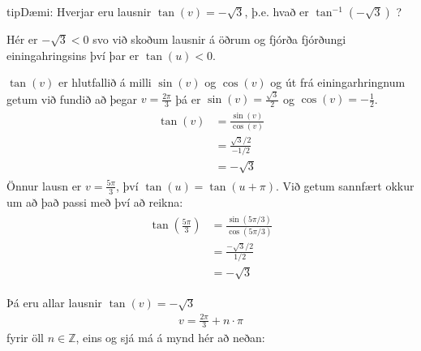 \documentclass[a4paper,10pt,icelandic]{sphinxmanual}
\begin{document}
\begin{sphinxadmonition}{tip}{Dæmi:}
Hverjar eru lausnir \(\tan(v)=-\sqrt{3}\), þ.e. hvað er \(\tan^{-1} (-\sqrt{3})\) ?

Hér er \(-\sqrt{3} <0\) svo við skoðum lausnir á öðrum og fjórða fjórðungi einingahringsins því þar er \(\tan(u)<0\).

\(\tan(v)\) er hlutfallið á milli \(\sin(v)\) og \(\cos(v)\) og út frá einingarhringnum getum við fundið að þegar \(v=\frac{2\pi}{3}\) þá er \(\sin(v) = \frac{\sqrt{3}}{2}\) og \(\cos(v) = -\frac12\).
\begin{equation*}
\begin{split}\begin{aligned}
\tan(v) &= \frac{\sin(v)}{\cos(v)} \\
&= \frac{\sqrt{3}/2}{-1/2} \\
&= -\sqrt{3}
\end{aligned}\end{split}
\end{equation*}
Önnur lausn er \(v=\frac{5\pi}{3}\), því \(\tan(u) = \tan(u+\pi)\).
Við getum sannfært okkur um að það passi með því að reikna:
\begin{equation*}
\begin{split}\begin{aligned}
\tan\left(\frac{5\pi}{3}\right) &= \frac{\sin(5\pi/3)}{\cos(5\pi/3)} \\
&= \frac{-\sqrt{3}/2}{1/2} \\
&= - \sqrt{3}
\end{aligned}\end{split}
\end{equation*}
\begin{figure}[H]
\centering

\noindent{}
\end{figure}

Þá eru allar lausnir \(\tan(v)=-\sqrt{3}\)
\begin{equation*}
\begin{split}v=\frac{2\pi}{3} + n \cdot \pi\end{split}
\end{equation*}
fyrir öll \(n \in \mathbb{Z}\), eins og sjá má á mynd hér að neðan:

\end{sphinxadmonition}
\end{document}
